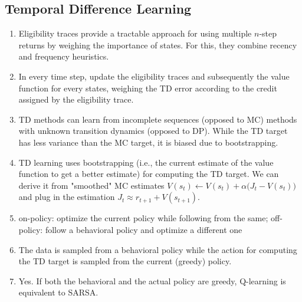 		\subsection{Temporal Difference Learning}
			\begin{enumerate}
				\item Eligibility traces provide a tractable approach for using multiple \(n\)-step returns by weighing the importance of states. For this, they combine recency and frequency heuristics.
				\item In every time step, update the eligibility traces and subsequently the value function for every states, weighing the \ac{TD} error according to the credit assigned by the eligibility trace.
				\item \ac{TD} methods can learn from incomplete sequences (opposed to \ac{MC}) methods with unknown transition dynamics (opposed to \ac{DP}). While the \ac{TD} target has less variance than the \ac{MC} target, it is biased due to bootstrapping.
				\item \ac{TD} learning uses bootstrapping (i.e., the current estimate of the value function to get a better estimate) for computing the \ac{TD} target. We can derive it from "smoothed" \ac{MC} estimates \( V(s_t) \gets V(s_t) + \alpha \bigl( J_t - V(s_t) \bigr) \) and plug in the estimation \( J_t \approx r_{t + 1} + V(s_{t + 1}) \).
				\item on-policy: optimize the current policy while following from the same; off-policy: follow a behavioral policy and optimize a different one
				\item The data is sampled from a behavioral policy while the action for computing the \ac{TD} target is sampled from the current (greedy) policy.
				\item Yes. If both the behavioral and the actual policy are greedy, Q-learning is equivalent to \ac{SARSA}.
			\end{enumerate}

